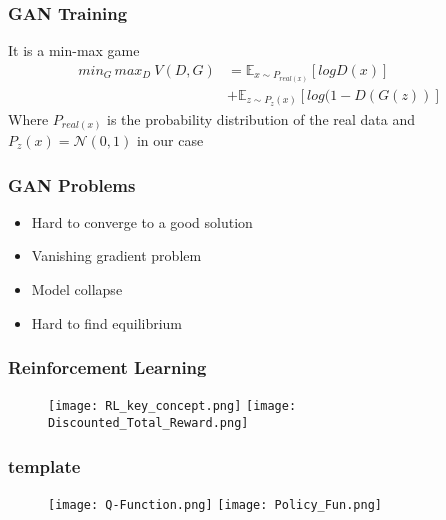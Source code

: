 \documentclass{beamer}
\newcommand\E{\ensuremath{\mathbb{E}}}
\begin{document}
\begin{frame}
\frametitle{GAN Training}
It is a min-max game
\begin{align*}
  min_G \, max_D \: V(D,G) &=
    \E_{x \sim P_{real(x)}} [ log D(x) ]
    \\                     &+
    \E_{z \sim P_z(x)} [ log ( 1 - D(G(z)) ]
\end{align*}
Where $P_{real(x)}$ is the probability distribution of the real data and $P_z(x) = \mathcal{N}(0,1)$ in our case

\end{frame}

\begin{frame}
\frametitle{GAN Problems}
\begin{itemize}
  \item Hard to converge to a good solution
  \item Vanishing gradient problem
  \item Model collapse
  \item Hard to find equilibrium
\end{itemize}
\end{frame}



\begin{frame}
\frametitle{Reinforcement Learning}
\begin{figure}[ht]
  \texttt{[image: RL\_key\_concept.png]}
  \texttt{[image: Discounted\_Total\_Reward.png]}
\end{figure}
\end{frame}

\begin{frame}
\frametitle{template}
\begin{figure}[ht]
  \texttt{[image: Q-Function.png]}
  \texttt{[image: Policy\_Fun.png]}
\end{figure}
\end{frame}


\end{document}
